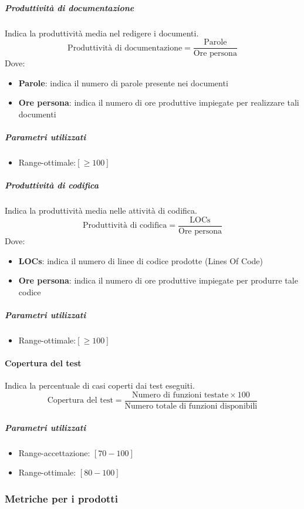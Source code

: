 \subparagraph{Produttività di documentazione}
Indica la produttività media nel redigere i documenti.
$$
\text{Produttività di documentazione} = \frac{\text{Parole}}{\text{Ore persona}}
$$
Dove:
\begin{itemize}
\item \textbf{Parole}: indica il numero di parole presente nei documenti
\item \textbf{Ore persona}: indica il numero di ore produttive impiegate per
  realizzare tali documenti
\end{itemize}

\subparagraph{Parametri utilizzati}
\begin{itemize}
\item Range-ottimale:$ [≥100]$
\end{itemize}



\subparagraph{Produttività di codifica}
Indica la produttività media nelle attività di codifica.
$$
\text{Produttività di codifica} = \frac{\text{LOCs}}{\text{Ore persona}}
$$
Dove:
\begin{itemize}
\item \textbf{LOCs}: indica il numero di linee di codice prodotte
  (Lines Of Code)
\item \textbf{Ore persona}: indica il numero di ore produttive
  impiegate per produrre tale codice
\end{itemize}
\subparagraph{Parametri utilizzati}
\begin{itemize}
	\item Range-ottimale:$ [≥100]$
\end{itemize}

\paragraph{Copertura del test}
Indica la percentuale di casi coperti dai test eseguiti.
$$
\text{Copertura del test} = \frac{\text{Numero di funzioni testate} \times 100}{\text{Numero totale
    di funzioni disponibili}}
$$

\subparagraph{Parametri utilizzati}
\begin{itemize}
\item Range-accettazione: $[70 - 100]$
\item Range-ottimale: $[80 - 100]$
\end{itemize}






\subsubsection{Metriche per i prodotti}

